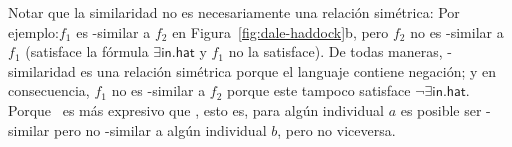 Notar que la similaridad no es necesariamente una relaci\'on sim\'etrica: Por ejemplo:$f_1$ es \el-similar a $f_2$ en
Figura~\ref{fig:dale-haddock}b, pero $f_2$ no es \el-similar a $f_1$
(satisface la f\'ormula $\exists \mathsf{in}.\mathsf{hat}$ y $f_1$
no la satisface).  De todas maneras, \alc-similaridad es una relaci\'on sim\'etrica porque
el languaje contiene negaci\'on; y en consecuencia, $f_1$ no es \alc-similar
a $f_2$ porque este tampoco satisface $\neg \exists
\mathsf{in}.\mathsf{hat}$.  Porque \alc\ es m\'as expresivo que \el,
esto es, para alg\'un individual $a$ es posible ser \el-similar pero
no \alc-similar a alg\'un individual $b$, pero no viceversa.\\






